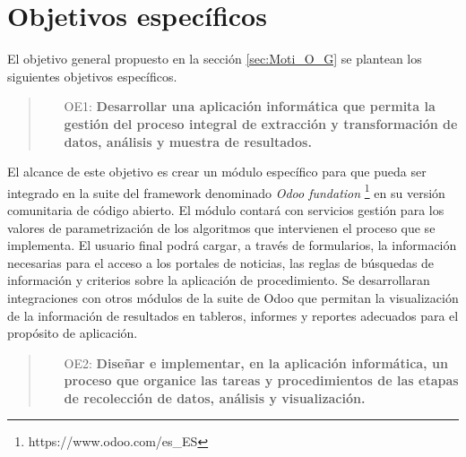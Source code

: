 \documentclass[12pt]{article}
\begin{document}
\section{Objetivos específicos}

El objetivo general propuesto en la sección \ref{sec:Moti_O_G} se plantean los siguientes objetivos específicos. 

    \begin{quote}
    \begin{itemize}
        \item [OE1:] \textbf{Desarrollar una aplicación informática que permita la gestión del proceso integral de extracción y transformación de datos, análisis y muestra de resultados.}
    \end{itemize}
    \end{quote}

        \vspace{0.3 cm}

        El alcance de este objetivo es crear un módulo específico para que pueda ser integrado en la suite del framework denominado \textit{Odoo  fundation} \footnote{https://www.odoo.com/es\_ES} en su versión comunitaria de código abierto.
        El módulo contará con servicios gestión para los valores de parametrización de los algoritmos que intervienen el proceso que se implementa. El usuario final podrá cargar, a través de formularios, la información necesarias para el acceso a los portales de noticias, las reglas de búsquedas de información y criterios sobre la aplicación de procedimiento. Se desarrollaran integraciones con otros módulos de la suite de Odoo que permitan la visualización de la información de resultados en tableros, informes y reportes adecuados para el propósito de aplicación.

        \vspace{0.3 cm}

        \begin{quote}
            \begin{itemize}
                \item [OE2:] \textbf{Diseñar e implementar, en la aplicación informática, un proceso que organice las tareas y procedimientos de las etapas de recolección de datos, análisis y visualización.} 
             \end{itemize}
        \end{quote}

        \vspace{0.3 cm}
\end{document}
